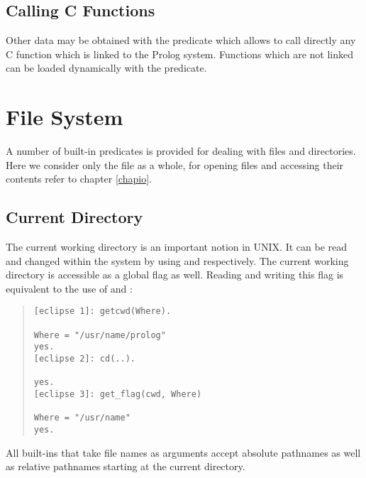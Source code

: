 \subsection{Calling C Functions}
Other data may be obtained with the predicate
which allows to call directly any C function which is
linked to the Prolog system.
Functions which are not linked can be loaded dynamically with the
 predicate.


\section{File System}
A number of built-in predicates is provided for dealing with files and
directories.
Here we consider only the file as a whole, for opening files and accessing
their contents refer to chapter \ref{chapio}.

\subsection{Current Directory}
The current working directory is an important notion in UNIX.
It can be read and changed within the {\eclipse} system by using
 and
 respectively.
The current working directory is accessible as a global flag as well.
Reading and writing this flag is equivalent to the use of
 and
:
\begin{quote}
\begin{verbatim}
[eclipse 1]: getcwd(Where).

Where = "/usr/name/prolog"
yes.
[eclipse 2]: cd(..).

yes.
[eclipse 3]: get_flag(cwd, Where)

Where = "/usr/name"
yes.
\end{verbatim}
\end{quote}
All {\eclipse} built-ins that take file names as arguments accept absolute
pathnames as well as relative pathnames starting at the current directory.

